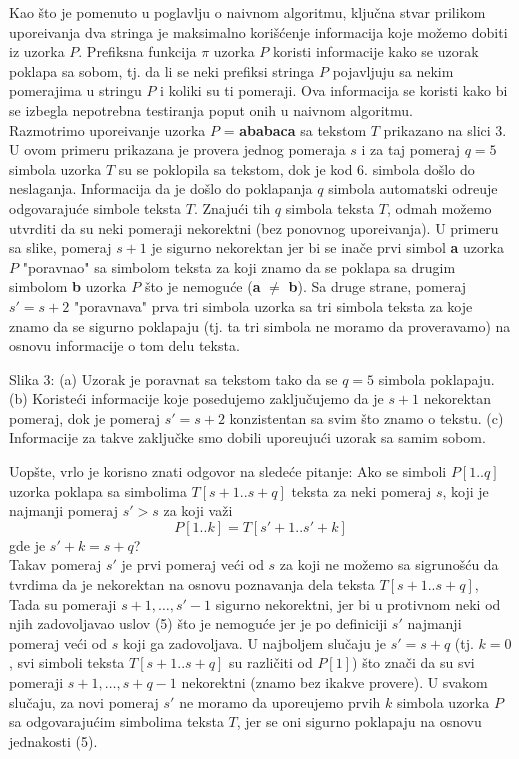 \documentclass[a4paper,12pt]{article}
\begin{document}
Kao \v sto je pomenuto u poglavlju o naivnom algoritmu, klju\v cna stvar prilikom upore\dj ivanja dva stringa je maksimalno kori\v s\' cenje informacija koje mo\v zemo dobiti iz uzorka $P$. Prefiksna funkcija $\pi$ uzorka $P$ koristi informacije kako se uzorak poklapa sa sobom, tj. da li se neki prefiksi stringa $P$ pojavljuju sa nekim pomerajima u stringu $P$ i koliki su ti pomeraji. Ova informacija se koristi kako bi se izbegla nepotrebna testiranja poput onih u naivnom algoritmu.
\\

Razmotrimo upore\dj ivanje uzorka $P$ = {\bf ababaca} sa tekstom $T$ prikazano na slici 3. U ovom primeru prikazana je provera jednog pomeraja $s$ i za taj pomeraj $q =5$ simbola uzorka $T$ su se poklopila sa tekstom, dok je kod 6. simbola do\v slo do neslaganja. Informacija da je do\v slo do poklapanja $q$ simbola automatski odre\dj uje odgovaraju\' ce simbole teksta $T$. Znaju\' ci tih $q$ simbola teksta $T$, odmah mo\v zemo utvrditi da su neki pomeraji nekorektni (bez ponovnog upore\dj ivanja). U primeru sa slike, pomeraj $s + 1$ je sigurno nekorektan jer bi se ina\v ce prvi simbol {\bf a} uzorka $P$ "poravnao" sa simbolom teksta za koji znamo da se poklapa sa drugim simbolom {\bf b} uzorka $P$ \v sto je nemogu\' ce ({\bf a} $\neq$ {\bf b}). Sa druge strane, pomeraj $s' = s + 2$ "poravnava" prva tri simbola uzorka sa tri simbola teksta za koje znamo da se sigurno poklapaju (tj. ta tri simbola ne moramo da proveravamo) na osnovu informacije o tom delu teksta.

\begin{center}
Slika 3: (a) Uzorak je poravnat sa tekstom tako da se $q = 5$ simbola poklapaju. (b) Koriste\' ci informacije koje posedujemo zaklju\v cujemo da je $s + 1$ nekorektan pomeraj, dok je pomeraj $s' = s + 2$ konzistentan sa svim \v sto znamo o tekstu. (c) Informacije za takve zaklju\v cke smo dobili upore\dj uju\' ci uzorak sa samim sobom.
\end{center}

Uop\v ste, vrlo je korisno znati odgovor na slede\' ce pitanje: Ako se simboli $P[1..q]$ uzorka poklapa sa simbolima $T[s + 1..s+q]$ teksta za neki pomeraj $s$, koji je najmanji pomeraj $s' > s$ za koji va\v zi
\begin{equation}
P[1..k] = T[s' + 1..s' + k]
\end{equation}
gde je $s' + k = s + q$?
\\

Takav pomeraj $s'$ je prvi pomeraj ve\' ci od $s$ za koji ne mo\v zemo sa sigruno\v s\' cu da tvrdima da je nekorektan na osnovu poznavanja dela teksta $T[s + 1..s + q]$, Tada su pomeraji $s+1, \ldots, s'-1$ sigurno nekorektni, jer bi u protivnom neki od njih zadovoljavao uslov (5) \v sto je nemogu\' ce jer je po definiciji $s'$ najmanji pomeraj ve\' ci od $s$ koji ga zadovoljava. U najboljem slu\v caju je $s' = s + q$ (tj. $k = 0$, svi simboli teksta $T[s + 1..s + q]$ su razli\v citi od $P[1]$) \v sto zna\v ci da su svi pomeraji $s + 1, \ldots, s + q - 1$ nekorektni (znamo bez ikakve provere). U svakom slu\v caju, za novi pomeraj $s'$ ne moramo da upore\dj ujemo prvih $k$ simbola uzorka $P$ sa odgovaraju\' cim simbolima teksta $T$, jer se oni sigurno poklapaju na osnovu jednakosti (5).
\end{document}

